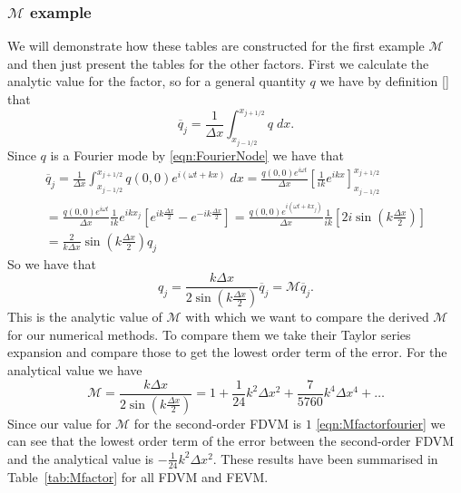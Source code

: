 \subsubsection{$\mathcal{M}$ example} 
We will demonstrate how these tables are constructed for the first example $\mathcal{M}$ and then just present the tables for the other factors. First we calculate the analytic value for the factor, so for a general quantity $q$ we have by definition [] that
\begin{equation*}
\overline{q}_j = \frac{1}{\Delta x} \int_{x_{j-1/2}}^{x_{j+1/2}} q \; dx.
\end{equation*}
Since $q$ is a Fourier mode by \eqref{eqn:FourierNode} we have that
\begin{multline*}
\overline{q}_j = \frac{1}{\Delta x} \int_{x_{j-1/2}}^{x_{j+1/2}} q(0,0) e^{i\left(\omega t + kx\right)} \; dx = \frac{q(0,0)e^{i \omega  t}}{\Delta x} \left[\frac{1}{ik} e^{ikx}\right]_{x_{j-1/2}}^{x_{j+1/2}} \\
= \frac{q(0,0)e^{i \omega  t}}{\Delta x} \frac{1}{ik} e^{ikx_j} \left[ e^{ik\frac{\Delta x}{2}} - e^{-ik\frac{\Delta x}{2}}\right] = \frac{q(0,0)e^{i \left(\omega  t + kx_j \right)}}{\Delta x} \frac{1}{ik} \left[ 2 i \sin \left(k\frac{\Delta x}{2}\right)\right]\\
=  \frac{2}{k\Delta x} \sin \left(k\frac{\Delta x}{2}\right) q_j
\end{multline*}
So we have that
\begin{equation}
q_j =  \frac{k\Delta x}{2 \sin \left(k\frac{\Delta x}{2}\right)  } \overline{q}_j = \mathcal{M}  \overline{q}_j.
\end{equation}
This is the analytic value of $\mathcal{M}$ with which we want to compare the derived $\mathcal{M}$ for our numerical methods. To compare them we take their Taylor series expansion and compare those to get the lowest order term of the error. For the analytical value we have
\begin{equation}
\mathcal{M} = \frac{k\Delta x}{2 \sin \left(k\frac{\Delta x}{2}\right)  } = 1 + \frac{1}{24} k^2 \Delta x^2 + \frac{7}{5760}k^4\Delta x ^4 + \dots
\end{equation}
Since our value for $\mathcal{M}$ for the second-order FDVM is $1$ \eqref{eqn:Mfactorfourier} we can see that the lowest order term of the error between the second-order FDVM and the analytical value is $-\frac{1}{24} k^2 \Delta x^2$. These results have been summarised in Table~\ref{tab:Mfactor} for all FDVM and FEVM.

